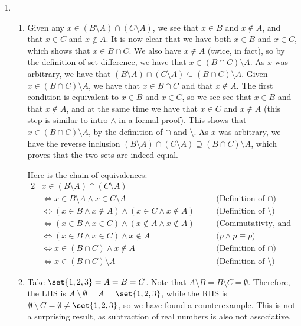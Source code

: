 \documentclass[12pt]{article}
\theoremstyle{definition}
\theoremstyle{remark}
\newcommand{\justif}[1]{&\quad &\text{(#1)}}
\begin{document}
\begin{enumerate}[leftmargin=\labelsep]
		\newpage
		\item 
		\begin{enumerate}
			\item Given any $x \in (B \setminus A) \cap (C \setminus A)$, we see that $x \in B$ and $x \not \in A$, and that $x \in C$ and $x \not \in A$. It is now clear that we have both $x \in B$ and $x \in C$, which shows that $x \in B \cap C$. We also have $x \not \in A$ (twice, in fact), so by the definition of set difference, we have that $x \in (B \cap C) \setminus A$. As $x$ was arbitrary, we have that $(B \setminus A) \cap (C \setminus A) \subseteq (B \cap C)\setminus A$. Given $x \in (B \cap C) \setminus A$, we have that $x \in B \cap C$ and that $x \not \in A$. The first condition is equivalent to $x \in B$ and $x \in C$, so we see see that $x \in B$ and that $x \not \in A$, and at the same time we have that $x \in C$ and $x \not \in A$ (this step is similar to intro $\land$ in a formal proof). This shows that $x \in (B \cap C) \setminus A$, by the definition of $\cap$ and $\setminus$. As $x$ was arbitrary, we have the reverse inclusion $(B \setminus A) \cap (C \setminus A) \supseteq (B \cap C)\setminus A$, which proves that the two sets are indeed equal.
			
			 Here is the chain of equivalences:
			\begin{alignat*}{2}
				&x \in (B \setminus A) \cap (C \setminus A) \\
				&\iff x \in B \setminus A \land x \in C \setminus A \justif{Definition of $\cap$}\\
				&\iff (x \in B \land x \not \in A) \land (x \in C \land x \not \in A) \justif{Definition of $\setminus$}\\
				&\iff (x \in B \land x \in C) \land (x \not \in A \land x \not \in A) \justif{Commutativty, and associativity twice} \\
				&\iff (x \in B \land x \in C) \land x \not \in A \justif{$p \land p \equiv p$} \\
				&\iff x \in (B \cap C) \land x \not \in A \justif{Definition of $\cap$} \\
				&\iff x \in (B \cap C) \setminus A \justif{Definition of $\setminus$}
			\end{alignat*}
			\item Take $\set{1, 2, 3} = A = B = C$. Note that $A \setminus B = B \setminus C = \emptyset$. Therefore, the LHS is $A \setminus \emptyset = A = \set{1, 2, 3}$, while the RHS is $\emptyset \setminus C = \emptyset \neq \set{1, 2, 3}$, so we have found a counterexample. This is not a surprising result, as subtraction of real numbers is also not associative.
		\end{enumerate}
	

\end{enumerate}
\end{document}
